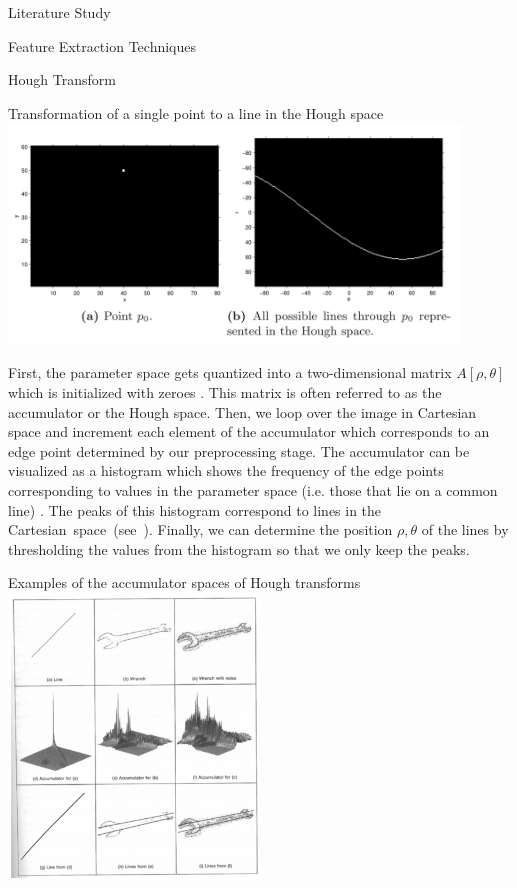 \documentclass{matthijs}
\begin{document}
\begin{hoofdstuk}{Literature Study}
\begin{paragraaf}{Feature Extraction Techniques}
\begin{subparagraaf}{Hough Transform}
				\begin{figuur}{Transformation of a single point to a line in the Hough space}
					\includegraphics[width=0.9\textwidth]{caltech2009line-img1.png}
					\cite{caltech2009line}
				\end{figuur}

				\bigskip

				First, the parameter space gets quantized into a two-dimensional matrix $ A[\rho,\theta] $ which is initialized with zeroes \cite{solberg2009hough}.
				This matrix is often referred to as the accumulator or the Hough space.
				Then, we loop over the image in Cartesian space and increment each element of the accumulator which corresponds to an edge point determined by our preprocessing stage.
				The accumulator can be visualized as a histogram which shows the frequency of the edge points corresponding to values in the parameter space (i.e. those that lie on a common line) \cite{kahl2000hough}.
				The peaks of this histogram correspond to lines in the \mbox{Cartesian space (see ).}
				Finally, we can determine the position $\rho,\theta$ of the lines by thresholding the values from the histogram so that we only keep the peaks.

				\begin{figuur}{Examples of the accumulator spaces of Hough transforms}
					\includegraphics[width=0.5\textwidth]{solberg2009hough-img1.png}
					\cite{solberg2009hough}
				\end{figuur}


\end{subparagraaf}
\end{paragraaf}
\end{hoofdstuk}
\end{document}
